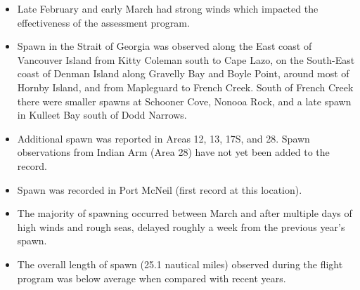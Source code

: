 \begin{itemize}

\item Late February and early March had strong winds
which impacted the effectiveness of the assessment program.

\item Spawn in the Strait of Georgia was observed
along the East coast of Vancouver Island from Kitty Coleman south to Cape Lazo,
on the South-East coast of Denman Island along Gravelly Bay and Boyle Point,
around most of Hornby Island, and
from Mapleguard to French Creek.
South of French Creek there were smaller spawns at
Schooner Cove, Nonooa Rock, and
a late spawn in Kulleet Bay south of Dodd Narrows.

\item Additional spawn was reported in Areas 12, 13, 17S, and 28.
Spawn observations from Indian Arm (Area 28)
have not yet been added to the record.

\item Spawn was recorded in Port McNeil (first record at this location).

\item The majority of spawning occurred between March  and 
after multiple days of high winds and rough seas,
delayed roughly a week from the previous year’s spawn.

\item The overall length of spawn (25.1 nautical miles)
observed during the flight program
was below average when compared with recent years.

\end{itemize}